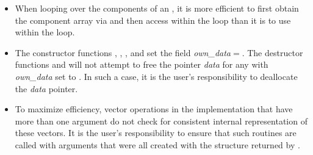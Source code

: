 \begin{itemize}
                                        
\item
  When looping over the components of an  , it is     
  more efficient to first obtain the component array via       
   and then access  within the     
  loop than it is to use  within the loop.        

\item
  The constructor functions , ,
  , and 
  set the field {\em own\_data}$=$. 
  The destructor functions  and 
  will not attempt to free the pointer {\em data} for any  with
  {\em own\_data} set to . In such a case, it is the user's responsibility to
  deallocate the {\em data} pointer.
                                     
\item
  To maximize efficiency, vector operations in the {\nvecs} implementation
  that have more than one  argument do not check for
  consistent internal representation of these vectors. It is the user's 
  responsibility to ensure that such routines are called with 
  arguments that were all created with the  structure returned
  by .

\end{itemize}

